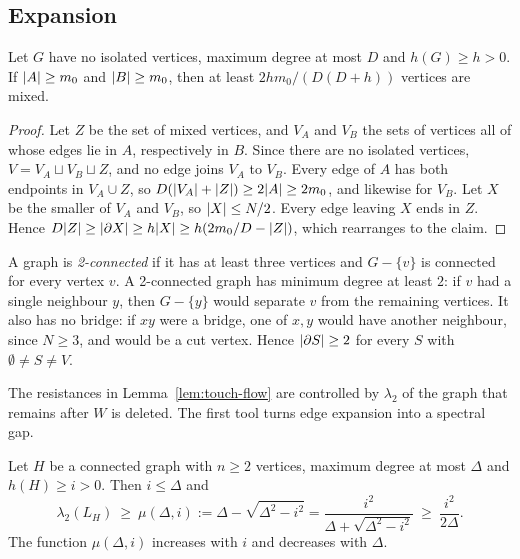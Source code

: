 \subsection{Expansion}\label{sec:expansion}

\begin{lemma}\label{lem:mixed-vertices}
Let $G$ have no isolated vertices, maximum degree at most $D$ and $h(G)\ge h>0$. If $\lvert A\rvert\ge m_0$ and $\lvert B\rvert\ge m_0$, then at least $2hm_0/(D(D+h))$ vertices are mixed.
\end{lemma}

\begin{proof}
Let $Z$ be the set of mixed vertices, and $V_A$ and $V_B$ the sets of vertices all of whose edges lie in $A$, respectively in $B$. Since there are no isolated vertices, $V=V_A\sqcup V_B\sqcup Z$, and no edge joins $V_A$ to $V_B$. Every edge of $A$ has both endpoints in $V_A\cup Z$, so $D(\lvert V_A\rvert+\lvert Z\rvert)\ge2\lvert A\rvert\ge2m_0$, and likewise for $V_B$. Let $X$ be the smaller of $V_A$ and $V_B$, so $\lvert X\rvert\le N/2$. Every edge leaving $X$ ends in $Z$. Hence $D\lvert Z\rvert\ge\lvert \partial X\rvert\ge h\lvert X\rvert\ge h(2m_0/D-\lvert Z\rvert)$, which rearranges to the claim.
\end{proof}

A graph is \emph{2-connected} if it has at least three vertices and $G-\{v\}$ is connected for every vertex $v$. A 2-connected graph has minimum degree at least $2$: if $v$ had a single neighbour $y$, then $G-\{y\}$ would separate $v$ from the remaining vertices. It also has no bridge: if $xy$ were a bridge, one of $x,y$ would have another neighbour, since $N\ge3$, and would be a cut vertex. Hence $\lvert \partial S\rvert\ge2$ for every $S$ with $\emptyset\ne S\ne V$.

The resistances in Lemma~\ref{lem:touch-flow} are controlled by $\lambda_2$ of the graph that remains after $W$ is deleted. The first tool turns edge expansion into a spectral gap.

\begin{lemma}\label{lem:cheeger}
Let $H$ be a connected graph with $n\ge2$ vertices, maximum degree at most $\Delta$ and $h(H)\ge i>0$. Then $i\le\Delta$ and
\[
  \lambda_2(L_H)\ \ge\ \mu(\Delta,i):=\Delta-\sqrt{\Delta^2-i^2}=\frac{i^2}{\Delta+\sqrt{\Delta^2-i^2}}\ \ge\ \frac{i^2}{2\Delta}.
\]
The function $\mu(\Delta,i)$ increases with $i$ and decreases with $\Delta$.
\end{lemma}

